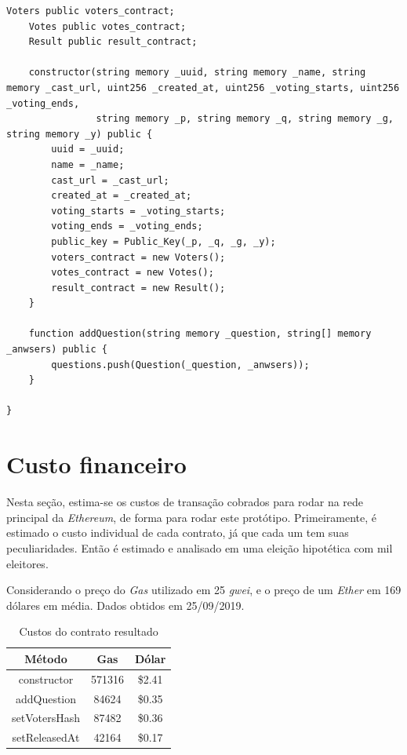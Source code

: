 \documentclass{ufsctex/ufsctex}
\begin{document}
\begin{lstlisting}[language=Solidity]
    Voters public voters_contract;
    Votes public votes_contract;
    Result public result_contract;
    
    constructor(string memory _uuid, string memory _name, string memory _cast_url, uint256 _created_at, uint256 _voting_starts, uint256 _voting_ends,
                string memory _p, string memory _q, string memory _g, string memory _y) public {
        uuid = _uuid;
        name = _name;
        cast_url = _cast_url;
        created_at = _created_at;
        voting_starts = _voting_starts;
        voting_ends = _voting_ends;
        public_key = Public_Key(_p, _q, _g, _y);
        voters_contract = new Voters();
        votes_contract = new Votes();
        result_contract = new Result();
    }
    
    function addQuestion(string memory _question, string[] memory _anwsers) public {
        questions.push(Question(_question, _anwsers));
    }
    
}

\end{lstlisting}

\section{Custo financeiro}

Nesta seção, estima-se os custos de transação cobrados para rodar na rede
principal da \textit{Ethereum}, de forma para rodar este protótipo.
Primeiramente, é estimado o custo individual de cada contrato, já que cada um
tem suas peculiaridades. Então é estimado e analisado em uma eleição hipotética
com mil eleitores.

Considerando o preço do \textit{Gas} utilizado em 25 \textit{gwei}, e o preço de um
\textit{Ether} em 169 dólares em média. Dados obtidos em 25/09/2019.

\begin{table}[htb]
\centering
\begin{tabular}{||c|c|c||}
\hline
	\textbf{Método}        & \textbf{Gas}    & \textbf{Dólar}  \\  [0.2ex] \hline \hline
constructor   & 571316 & \$2.41 \\
addQuestion   & 84624  & \$0.35 \\ 
setVotersHash & 87482  & \$0.36 \\ 
setReleasedAt & 42164  & \$0.17 \\ \hline
\end{tabular}
\caption{Custos do contrato resultado}
\label{tab:my-table}
\end{table}
\end{document}
